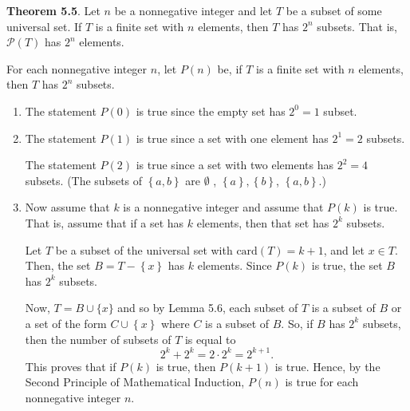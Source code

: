 \documentclass[11pt]{article}
\begin{document}
\setcounter{equation}{0}
\noindent
\textbf{Theorem 5.5}.  Let  $n$  be a nonnegative integer and let  $T$  be a subset of some universal set.  If  $T$  is a finite set with  $n$  elements, then  $T$  has  $2^n $  subsets.  That is,  $ {\mathcal{P}\left( T \right)}$ has $2^n$ elements.

\vskip6pt
\noindent
For each nonnegative integer  $n$, let  $P\left( n \right)$ be, if  $T$  is a finite set with  
$n$  elements, then  $T$  has  $2^n $  subsets.

\begin{enumerate}
\item The statement  $P\left( 0 \right)$ is true since the empty set has  $2^0  = 1$ subset. 

\item The statement  $P\left( 1 \right)$ is true since a set with one element has  $2^1  = 2$ subsets.

The statement  $P\left( 2 \right)$ is true since a set with two elements has  $2^2  = 4$
 subsets. (The subsets of  $\left\{ {a, b} \right\}$ are  
$\emptyset$ , $\left\{ a \right\}, \left\{ b \right\}$, $\left\{ {a, b} \right\}$.)

\item Now assume that  $k$  is a nonnegative integer and assume that  $P\left( k \right)$ is true.  That is, assume that if a set has  $k$  elements, then that set has  $2^k $ subsets. 

Let  $T$  be a subset of the universal set with  $\text{card}(T) = k + 1$, and let  $x \in T$.  Then, the set  $B = T - \left\{ x \right\}$  has  $k$  elements.  Since  $P\left( k \right)$
 is true, the set  $B$  has  $2^k $ subsets.

Now, $T = B \cup \{ x \}$ and so by Lemma 5.6,  each subset of  $T$  is a subset of  $B$  or a set of the form  
$C  \cup \left\{ x \right\}$ where  $C$  is a subset of  $B$.  So, if  $B$  has  $2^k $
 subsets, then the number of subsets of  $T$ is equal to
\[
2^k  + 2^k  = 2 \cdot 2^k  = 2^{k + 1} .
\]
This proves that if  $P\left( k \right)$ is true, then  $P\left( {k + 1} \right)$ is true.  Hence, by the Second Principle of Mathematical Induction,  $P\left( n \right)$ is true for each nonnegative integer  $n$.
\end{enumerate}
\end{document}
